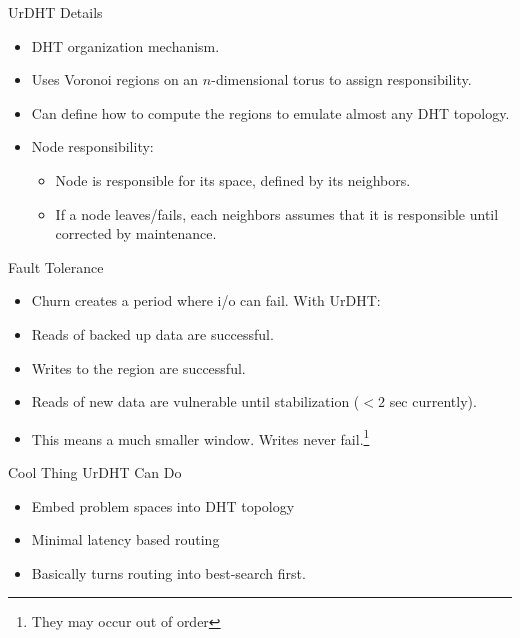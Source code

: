 \documentclass[11pt]{beamer}
\begin{document}
\begin{frame}{UrDHT Details}
	\begin{itemize}
		\item DHT organization mechanism.
		
		\item Uses Voronoi regions on an $n$-dimensional torus to assign responsibility.
		\item Can define how to compute the regions to emulate almost any DHT topology.
		\item Node responsibility:
		\begin{itemize}
			\item Node is  responsible for its space, defined by its neighbors.
			\item If a node leaves/fails, each neighbors assumes that it is responsible until corrected by maintenance. 
		\end{itemize}
	\end{itemize}


\end{frame}

\begin{frame}{Fault Tolerance}
	\begin{itemize}
		\item Churn creates a period where i/o can fail.  With UrDHT:
		\item Reads of backed up data are successful.
		\item Writes to the region are successful. 
		\item Reads of new data are vulnerable until stabilization ($ <2$ sec currently).
		\item This means a much smaller window.  Writes never fail.\footnote{They may occur out of order}
		
	\end{itemize}


\end{frame}


\begin{frame}{Cool Thing UrDHT Can Do}
	\begin{itemize}
		\item Embed problem spaces into DHT topology
		\item Minimal latency based routing
		\item Basically turns routing into best-search first.
		
	\end{itemize}
\end{frame}
\end{document}
